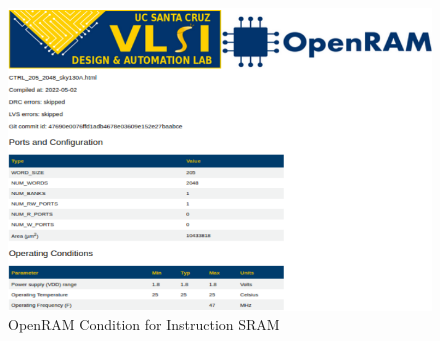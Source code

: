 \begin{figure}
    \centering
    \includegraphics[width=0.8\linewidth]{./ASIC/OpenRAM_INST_condition.png}
    \caption{OpenRAM Condition for Instruction SRAM}
    \end{figure}
  
